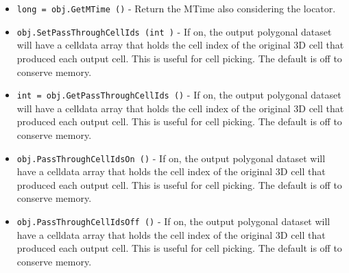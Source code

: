 \begin{itemize}
\item  \verb|long = obj.GetMTime ()| -  Return the MTime also considering the locator.

\item  \verb|obj.SetPassThroughCellIds (int )| -  If on, the output polygonal dataset will have a celldata array that
 holds the cell index of the original 3D cell that produced each output
 cell. This is useful for cell picking. The default is off to conserve
 memory.

\item  \verb|int = obj.GetPassThroughCellIds ()| -  If on, the output polygonal dataset will have a celldata array that
 holds the cell index of the original 3D cell that produced each output
 cell. This is useful for cell picking. The default is off to conserve
 memory.

\item  \verb|obj.PassThroughCellIdsOn ()| -  If on, the output polygonal dataset will have a celldata array that
 holds the cell index of the original 3D cell that produced each output
 cell. This is useful for cell picking. The default is off to conserve
 memory.

\item  \verb|obj.PassThroughCellIdsOff ()| -  If on, the output polygonal dataset will have a celldata array that
 holds the cell index of the original 3D cell that produced each output
 cell. This is useful for cell picking. The default is off to conserve
 memory.

\end{itemize}

